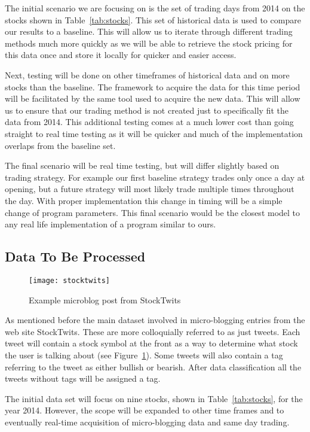 The initial scenario we are focusing on is the set of trading days from 2014 on the stocks shown in Table~\ref{tab:stocks}. This set of historical data is used to compare our results to a baseline. This will allow us to iterate through different trading methods much more quickly as we will be able to retrieve the stock pricing for this data once and store it locally for quicker and easier access.

Next, testing will be done on other timeframes of historical data and on more stocks than the baseline. The framework to acquire the data for this time period will be facilitated by the same tool used to acquire the new data. This will allow us to ensure that our trading method is not created just to specifically fit the data from 2014. This additional testing comes at a much lower cost than going straight to real time testing as it will be quicker and much of the implementation overlaps from the baseline set. 

The final scenario will be real time testing, but will differ slightly based on trading strategy. For example our first baseline strategy trades only once a day at opening, but a future strategy will most likely trade multiple times throughout the day. With proper implementation this change in timing will be a simple change of program parameters. This final scenario would be the closest model to any real life implementation of a program similar to ours. 

\subsection{Data To Be Processed}

\begin{figure}
  \centering
  \texttt{[image: stocktwits]}
  \caption{Example microblog post from StockTwits}\label{fig:stocktwits}
\end{figure}

As mentioned before the main dataset involved in micro-blogging entries from the web site StockTwits. These are more colloquially referred to as just tweets. Each tweet will contain a stock symbol at the front as a way to determine what stock the user is talking about (see Figure~\ref{fig:stocktwits}). Some tweets will also contain a tag referring to the tweet as either bullish or bearish. After data classification all the tweets without tags will be assigned a tag.

The initial data set will focus on nine stocks, shown in Table~\ref{tab:stocks}, for the year 2014. However, the scope will be expanded to other time frames and to eventually real-time acquisition of micro-blogging data and same day trading.

